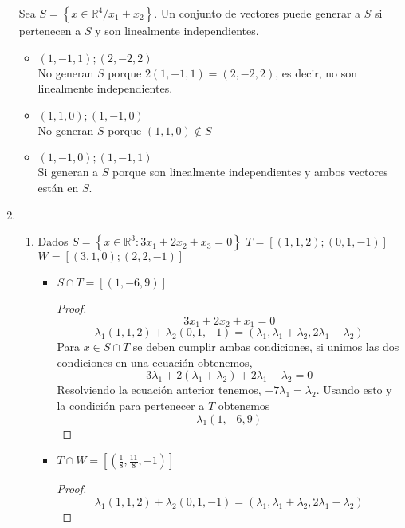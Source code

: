 \documentclass[11pt]{article}
\begin{document}
\begin{enumerate}
    Sea $S=\left\{ x \in \mathbb{R}^4 / x_1 + x_2\right\}$. Un conjunto de vectores 
    puede generar a $S$  si pertenecen a $S$ y son linealmente independientes.
    \begin{itemize}
      \item $(1,-1,1);(2,-2,2)$ \\
        No generan $S$ porque $2 (1,-1,1) = (2, -2,2)$, es decir, no son linealmente
        independientes.
      \item $(1,1,0) ;(1,-1,0)$ \\
        No generan $S$ porque $(1,1,0)\notin S$
      \item $(1,-1,0);(1,-1,1)$ \\
        Si generan a $S$ porque son linealmente independientes y ambos vectores
        están en $S$.
    \end{itemize}
  \item \begin{enumerate}
          \item Dados $S=\left\{x \in \mathbb{R}^{3}: 3 x_{1}+2 x_{2}+x_{3}=0\right\}$
            $T=[(1,1,2) ;(0,1,-1)]$ $W=[(3,1,0) ;(2,2,-1)]$
            \begin{itemize}
              \item $S\cap T = [(1,-6,9)]$
                \begin{proof}
                  \[ 3 x_1 + 2 x_2 + x_1 = 0 \tag{Condicion para pertenecer a $S$}\]
                  \[ \lambda_1 (1,1,2) + \lambda_2 (0,1,-1) = (\lambda_1, \lambda_1
                    + \lambda_2, 2 \lambda_1 - \lambda_2) 
                  \tag{Condicion para pertenecer a $T$} \]
                  Para $x \in S \cap T$ se deben cumplir ambas condiciones,
                  si unimos las dos condiciones en una ecuación obtenemos,
                  \[ 3 \lambda_1 + 2 (\lambda_1+\lambda_2) + 
                  2\lambda_1 - \lambda_2 = 0\]
                  Resolviendo la ecuación anterior tenemos, $-7\lambda_1 = \lambda_2$.
                  Usando esto y la condición para pertenecer a $T$ obtenemos 
                  \[ \lambda_1 (1, -6, 9) \]
                \end{proof}  
              \item $T \cap W = \left[\left(\frac{1}{8},\frac{11}{8},-1\right)\right] $
                \begin{proof}
                  \[ \lambda_1 (1,1,2) + \lambda_2 (0,1,-1) = (\lambda_1, \lambda_1
                    + \lambda_2, 2 \lambda_1 - \lambda_2) 
                  \tag{Condicion para pertenecer a $T$} \]

\end{proof}
\end{itemize}
\end{enumerate}
\end{enumerate}
\end{document}
